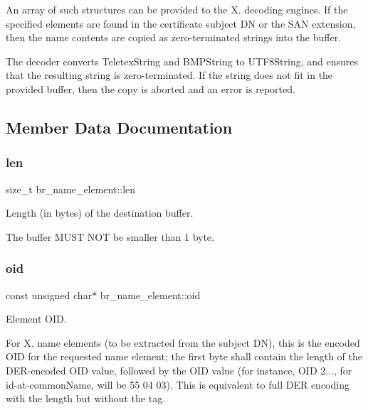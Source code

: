 An array of such structures can be provided to the X. decoding engines. If the specified elements are found in the certificate subject DN or the S\+AN extension, then the name contents are copied as zero-\/terminated strings into the buffer.

The decoder converts Teletex\+String and B\+M\+P\+String to U\+T\+F8\+String, and ensures that the resulting string is zero-\/terminated. If the string does not fit in the provided buffer, then the copy is aborted and an error is reported. 

\subsection{Member Data Documentation}
\mbox{\label{structbr__name__element_a4dfc9930093f0dbbaa94dd8684d58716}} 
\subsubsection{\texorpdfstring{len}{len}}
{\footnotesize\ttfamily size\+\_\+t br\+\_\+name\+\_\+element\+::len}



Length (in bytes) of the destination buffer. 

The buffer M\+U\+ST N\+OT be smaller than 1 byte. \mbox{\label{structbr__name__element_ae21b72b8ccfe1f2da35a43d307e16a76}} 
\subsubsection{\texorpdfstring{oid}{oid}}
{\footnotesize\ttfamily const unsigned char$\ast$ br\+\_\+name\+\_\+element\+::oid}



Element O\+ID. 

For X. name elements (to be extracted from the subject DN), this is the encoded O\+ID for the requested name element; the first byte shall contain the length of the D\+E\+R-\/encoded O\+ID value, followed by the O\+ID value (for instance, O\+ID 2..., for id-\/at-\/common\+Name, will be { 55 04 03}). This is equivalent to full D\+ER encoding with the length but without the tag.

